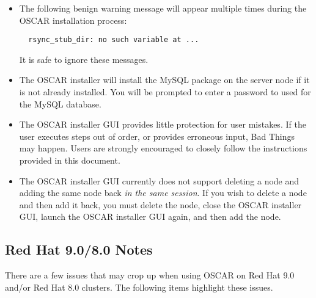 \begin{itemize}
\item The following benign warning message will appear multiple times
  during the OSCAR installation process:

\begin{verbatim}
  rsync_stub_dir: no such variable at ...
\end{verbatim}

  It is safe to ignore these messages.
  
\item The OSCAR installer will install the MySQL package on the server
  node if it is not already installed.  You will be prompted to enter a
  password to used for the MySQL database.
  
\item The OSCAR installer GUI provides little protection for user
  mistakes.  If the user executes steps out of order, or provides
  erroneous input, Bad Things may happen.  Users are strongly
  encouraged to closely follow the instructions provided in this
  document.

\item The OSCAR installer GUI currently does not support deleting a
  node and adding the same node back {\em in the same session}.  If
  you wish to delete a node and then add it back, you must delete the
  node, close the OSCAR installer GUI, launch the OSCAR installer GUI
  again, and then add the node.

\end{itemize}


\subsection{Red Hat 9.0/8.0 Notes}
\label{subsec:rh90notes}

There are a few issues that may crop up when using OSCAR on Red Hat 9.0
and/or Red Hat 8.0 clusters.  The following items highlight these
issues.  

